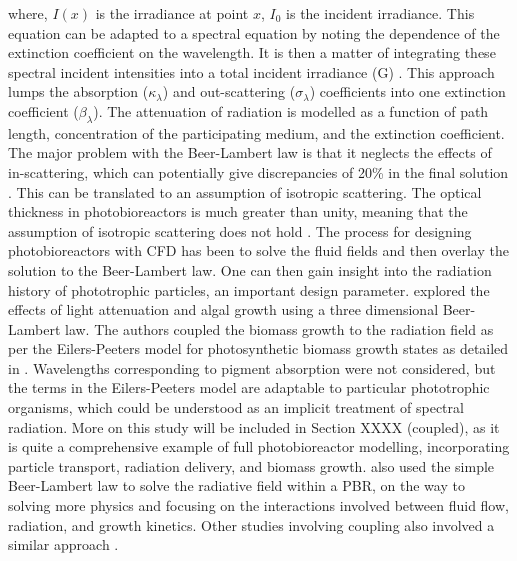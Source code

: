 where, $I(x)$ is the irradiance at point $x$, $I_0$ is the incident irradiance. This equation can be adapted to a spectral equation by noting the dependence of the extinction coefficient on the wavelength. It is then a matter of integrating these spectral incident intensities into a total incident irradiance (G) \cite{Pottier2005}.
\skippingparagraph
This approach lumps the absorption ($\kappa_\lambda$) and out-scattering ($\sigma_\lambda$) coefficients into one extinction coefficient ($\beta_\lambda$). The attenuation of radiation is modelled as a function of path length, concentration of the participating medium, and the extinction coefficient. The major problem with the Beer-Lambert law is that it neglects the effects of in-scattering, which can potentially give discrepancies of 20\% in the final solution \cite{Berberoglu2007,Pottier2005,Wang2014a}. This can be translated to an assumption of isotropic scattering. The optical thickness in photobioreactors is much greater than unity, meaning that the assumption of isotropic scattering does not hold \cite{Modest2003}. 
\skippingparagraph
The process for designing photobioreactors with CFD has been to solve the fluid fields and then overlay the solution to the Beer-Lambert law. One can then gain insight into the radiation history of phototrophic particles, an important design parameter. \cite{Marshall2010} explored the effects of light attenuation and algal growth using a three dimensional Beer-Lambert law. The authors coupled the biomass growth to the radiation field as per the Eilers-Peeters model for photosynthetic biomass growth states as detailed in \cite{Bechet2013}. Wavelengths corresponding to pigment absorption were not considered, but the terms in the Eilers-Peeters model are adaptable to particular phototrophic organisms, which could be understood as an implicit treatment of spectral radiation. More on this study will be included in Section XXXX (coupled), as it is quite a comprehensive example of full photobioreactor modelling, incorporating particle transport, radiation delivery, and biomass growth. \cite{Nauha2013} also used the simple Beer-Lambert law to solve the radiative field within a PBR, on the way to solving more physics and focusing on the interactions involved between fluid flow, radiation, and growth kinetics. Other studies involving coupling also involved a similar approach \cite{Marshall2011}. 
\skippingparagraph

